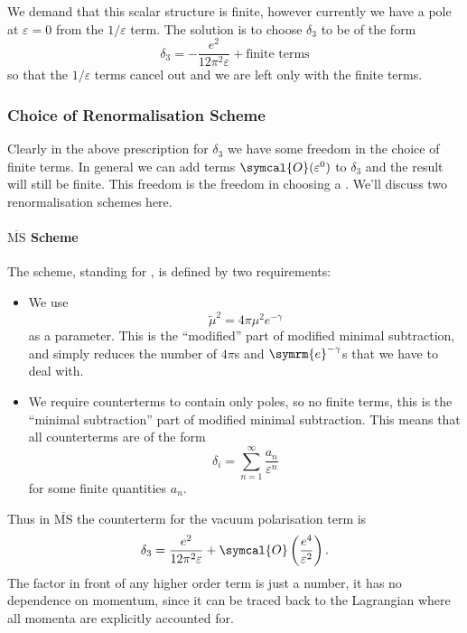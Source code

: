 \documentclass[fleqn]{NotesClass}
\newcommand{\MSbar}{\ensuremath{\overline{\text{MS}}}}
\newcommand{\e}{\symrm{e}}
\newcommand{\order}{\symcal{O}}
\begin{document}
    We demand that this scalar structure is finite, however currently we have a pole at \(\varepsilon = 0\) from the \(1/\varepsilon\) term.
    The solution is to choose \(\delta_3\) to be of the form
    \begin{equation}\label{eqn:delta 3 QED}
        \delta_3 = -\frac{e^2}{12\pi^2 \varepsilon} + \text{finite terms}
    \end{equation}
    so that the \(1/\varepsilon\) terms cancel out and we are left only with the finite terms.
    
    \subsubsection{Choice of Renormalisation Scheme}
    Clearly in the above prescription for \(\delta_3\) we have some freedom in the choice of finite terms.
    In general we can add terms \(\order(\varepsilon^0)\) to \(\delta_3\) and the result will still be finite.
    This freedom is the freedom in choosing a .
    We'll discuss two renormalisation schemes here.
    
    \paragraph{\MSbar{} Scheme}
    The \define{\MSbar}\index{MS@\MSbar} scheme, standing for , is defined by two requirements:
    \begin{itemize}
        \item We use
        \begin{equation}
            \tilde{\mu}^2 = 4\pi \mu^2 e^{-\gamma}
        \end{equation}
        as a parameter.
        This is the \enquote{modified} part of modified minimal subtraction, and simply reduces the number of \(4\pi\)s and \(\e^{-\gamma}\)s that we have to deal with.
        \item We require counterterms to contain only poles, so no finite terms, this is the \enquote{minimal subtraction} part of modified minimal subtraction.
        This means that all counterterms are of the form
        \begin{equation}
            \delta_i = \sum_{n = 1}^{\infty} \frac{a_n}{\varepsilon^n}
        \end{equation}
        for some finite quantities \(a_n\).
    \end{itemize}
    Thus in \MSbar{} the counterterm for the vacuum polarisation term is
    \begin{equation}
        \delta_3 = \frac{e^2}{12\pi^2\varepsilon} + \order\left( \frac{e^4}{\varepsilon^2} \right).
    \end{equation}
    The factor in front of any higher order term is just a number, it has no dependence on momentum, since it can be traced back to the Lagrangian where all momenta are explicitly accounted for.
    
\end{document}
